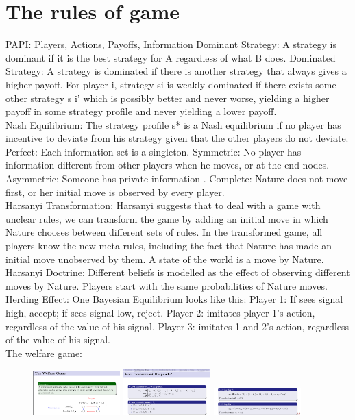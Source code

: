 \documentclass{article}
\begin{document}
\section{The rules of game}
PAPI: Players, Actions, Payoffs, Information
Dominant Strategy: A strategy is dominant if it is the best strategy for A regardless of what B does.
Dominated Strategy: A strategy is dominated if there is another strategy that always gives a higher payoff.
For player i, strategy si is weakly dominated if there exists some other strategy s
i' which is possibly better and never worse, yielding a higher payoff
in some strategy profile and never yielding a lower payoff.\\
Nash Equilibrium: The strategy profile s* is a Nash equilibrium if no player has incentive to deviate from his strategy given that the other players do not deviate.\\
Perfect: Each information set is a singleton.  
Symmetric: No player has information different from
other players when he moves, or at the end
nodes. 
Asymmetric: Someone has private information . 
Complete: Nature does not move first, or her initial
move is observed by every player. \\
Harsanyi Transformation: Harsanyi suggests that to deal with a game with unclear rules, we can
transform the game by adding an initial move in which Nature chooses
between different sets of rules. In the transformed game, all players know the new meta-rules, including the
fact that Nature has made an initial move unobserved by them.
A state of the world is a move by Nature.\\
Harsanyi Doctrine: Different beliefs is modelled as the effect of observing different moves by
Nature. Players start with the same probabilities of Nature moves.\\
Herding Effect: One Bayesian Equilibrium looks like this:
Player 1: If sees signal high, accept; if sees signal low, reject.
Player 2: imitates player 1’s action, regardless of the value of his signal.
Player 3: imitates 1 and 2’s action, regardless of the value of his signal.\\
The welfare game:\\
\begin{figure}[H]
\includegraphics[width=0.3\textwidth]{welfare1.png}
\includegraphics[width=0.3\textwidth]{welfare2.png}
\includegraphics[width=0.3\textwidth]{welfare3.png}
\end{figure}
\end{document}
